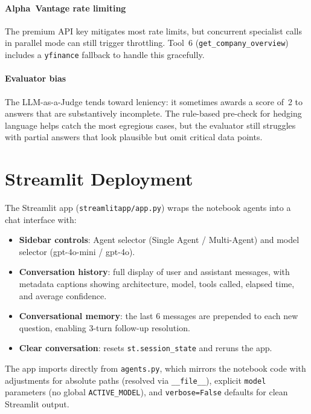 \documentclass[conference]{IEEEtran}
\begin{document}
\paragraph{Alpha~Vantage rate limiting}
The premium API key mitigates most rate limits, but concurrent specialist calls in
parallel mode can still trigger throttling.  Tool~6 (\texttt{get\_company\_overview})
includes a \texttt{yfinance} fallback to handle this gracefully.

\paragraph{Evaluator bias}
The LLM-as-a-Judge tends toward leniency: it sometimes awards a score of~2 to answers
that are substantively incomplete.  The rule-based pre-check for hedging language helps
catch the most egregious cases, but the evaluator still struggles with partial answers
that look plausible but omit critical data points.

\section{Streamlit Deployment}

The Streamlit app (\texttt{streamlitapp/app.py}) wraps the notebook agents into a
chat interface with:

\begin{itemize}
  \item \textbf{Sidebar controls}: Agent selector (Single Agent / Multi-Agent) and
        model selector (gpt-4o-mini / gpt-4o).
  \item \textbf{Conversation history}: full display of user and assistant messages,
        with metadata captions showing architecture, model, tools called, elapsed time,
        and average confidence.
  \item \textbf{Conversational memory}: the last 6 messages are prepended to each new
        question, enabling 3-turn follow-up resolution.
  \item \textbf{Clear conversation}: resets \texttt{st.session\_state} and reruns the app.
\end{itemize}

The app imports directly from \texttt{agents.py}, which mirrors the notebook code with
adjustments for absolute paths (resolved via \texttt{\_\_file\_\_}), explicit
\texttt{model} parameters (no global \texttt{ACTIVE\_MODEL}), and \texttt{verbose=False}
defaults for clean Streamlit output.
\end{document}
